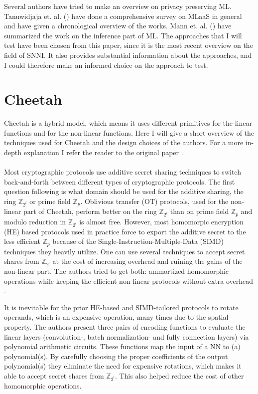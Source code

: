 \documentclass[../thesis.tex]{subfiles}
\begin{document}
Several authors have tried to make an overview on privacy preserving ML. Tanuwidjaja et. al. (\citeyear{tanuwidjaja2020}) have done a comprehensive survey on MLaaS in general and have given a chronological overview of the works. Mann et. al. (\citeyear{mann22}) have summarized the work on the inference part of ML. The approaches that I will test have been chosen from this paper, since it is the most recent overview on the field of SNNI. It also provides substantial information about the approaches, and I could therefore make an informed choice on the approach to test.  

\section{Cheetah}
Cheetah is a hybrid model, which means it uses different primitives for the linear functions and for the non-linear functions. Here I will give a short overview of the techniques used for Cheetah and the design choices of the authors. For a more in-depth explanation I refer the reader to the original paper \parencite{cheetah}. \paragraph{}

Most cryptographic protocols use additive secret sharing techniques to switch back-and-forth between different types of cryptographic protocols. The first question following is what domain should be used for the additive sharing, the ring $\mathbb{Z}_{2^l}$ or prime field $\mathbb{Z}_{p}$. Oblivious transfer (OT) protocols, used for the non-linear part of Cheetah, perform better on the ring $\mathbb{Z}_{2^l}$ than on prime field $\mathbb{Z}_{p}$ and modulo reduction in $\mathbb{Z}_{2^l}$ is almost free. However, most homomorpic encryption (HE) based protocols used in practice force to export the additive secret to the less efficient $\mathbb{Z}_{p}$ because of the Single-Instruction-Multiple-Data (SIMD) techniques they heavily utilize. One can use several techniques to accept secret shares from $\mathbb{Z}_{2^l}$ at the cost of increasing overhead and ruining the gains of the non-linear part. The authors tried to get both: ammortized homomorphic operations while keeping the efficient non-linear protocols without extra overhead \parencite[p 810]{cheetah}.

It is inevitable for the prior HE-based and SIMD-tailored protocols to rotate operands, which is an expensive operation, many times due to the spatial property. The authors present three pairs of encoding functions to evaluate the linear layers (convolution-, batch normalization- and fully connection layers) via polynomial arithmetic circuits. These functions map the input of a NN to (a) polynomial(s). By carefully choosing the proper coefficients of the output polynomial(s) they eliminate the need for expensive rotations, which makes it able to accept secret shares from $\mathbb{Z}_{2^l}$. This also helped reduce the cost of other homomorphic operations. 
\end{document}
